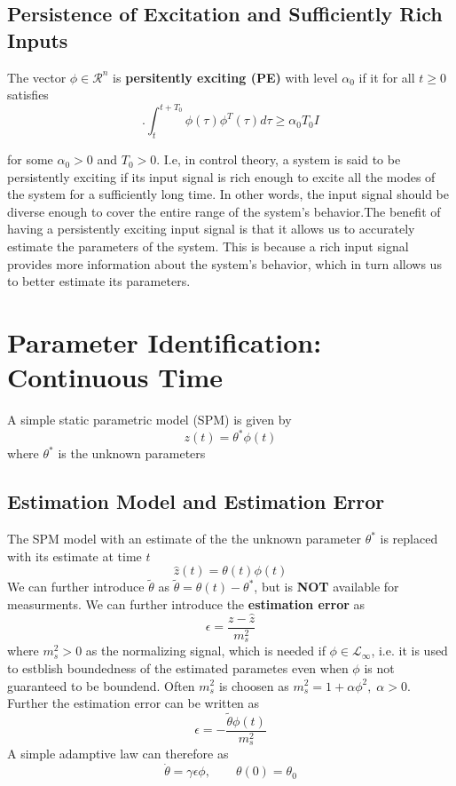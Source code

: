 \documentclass[10pt]{article}
\begin{document}
\begin{multicols*}{2}
\subsection{Persistence of Excitation and Sufficiently Rich Inputs}
The vector $\phi \in \mathcal{R}^n$ is \textbf{persitently exciting (PE)} with level $\alpha_0$ if it for all $t \geq 0$ satisfies
\begin{equation*}.
	\int_{t}^{t+T_0}\phi(\tau)\phi^T(\tau)d\tau \geq \alpha_0 T_0 I
\end{equation*}

for some $\alpha_0 > 0$ and \(T_0 > 0\). I.e, in control theory, a system is said to be persistently exciting if its input signal is rich enough to excite all the modes of the system for a sufficiently long time. In other words, the input signal should be diverse enough to cover the entire range of the system's behavior.The benefit of having a persistently exciting input signal is that it allows us to accurately estimate the parameters of the system. This is because a rich input signal provides more information about the system's behavior, which in turn allows us to better estimate its parameters.
\section{Parameter Identification: Continuous Time}
A simple static parametric model (SPM) is given by
\begin{equation}
	z(t) = \theta^{*}\phi(t)
\end{equation}
where $\theta^{*}$ is the unknown parameters
\subsection{Estimation Model and Estimation Error}
The SPM model with an estimate of the the unknown parameter $\theta^{*}$ is replaced with its estimate at time $t$
\begin{equation}
	\hat{z}(t) = \theta(t)\phi(t)
\end{equation}
We can further introduce $\tilde{\theta}$ as $\tilde{\theta}=\theta(t)-\theta^*$, but is \textbf{NOT} available for measurments. We can further introduce the \textbf{estimation error} as
\begin{equation}
	\epsilon = \frac{z - \hat{z}}{m_s ^2}
\end{equation}
where $m_s^2 > 0$ as the normalizing signal, which is needed if $\phi \in \mathcal{L}_{\infty}$, i.e. it is used to estblish boundedness of the estimated parametes even when $\phi$ is not guaranteed to be boundend. Often $m_s^2$ is choosen as $m_s^2=1+\alpha \phi^2, \; \alpha > 0$. Further the estimation error can be written as
\begin{equation}
	\epsilon = - \frac{\tilde{\theta}\phi(t)}{m_s ^2}
\end{equation}
A simple adamptive law can therefore as
\begin{equation}
	\dot \theta = \gamma \epsilon \phi, \qquad \theta(0) = \theta_0
\end{equation}

\end{multicols*}
\end{document}
